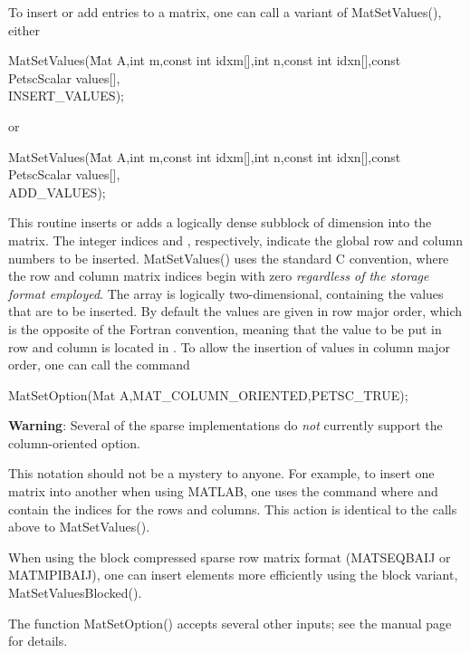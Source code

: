 To insert or add entries to a matrix, one can call a variant of MatSetValues(), either
\begin{tabbing}
  MatSetValues(\=Mat A,int m,const int idxm[],int n,const int idxn[],const PetscScalar values[],\\
            \>INSERT_VALUES);
\end{tabbing}
or 
\begin{tabbing}
  MatSetValues(\=Mat A,int m,const int idxm[],int n,const int idxn[],const PetscScalar values[],\\
            \>ADD_VALUES);
\end{tabbing}
This routine inserts or adds a logically dense subblock of dimension
 into the 
matrix. The integer indices  and , respectively, indicate the 
global row and column numbers to be inserted.  MatSetValues() uses the 
standard C convention, where the row and column matrix indices begin with 
zero {\em regardless of the storage format employed}.   The array 
 is logically two-dimensional, containing the values that are 
to be inserted. By default the values are given in row major order, which is the
opposite of the Fortran convention, meaning that the value to be put in row
 and column  is located in . To
allow the insertion of values in column major order, one can call the command
\begin{tabbing}
  MatSetOption(Mat A,MAT\_COLUMN\_ORIENTED,PETSC_TRUE);
\end{tabbing}
{\bf Warning}: Several of the sparse implementations do {\em not} currently
support the column-oriented option.

This notation should not be a mystery to anyone. For example, 
to insert one matrix into another when using MATLAB, one uses the command 
 where  and  contain the indices for the
rows and columns. This action is identical to the calls above to 
MatSetValues().

When using the block compressed sparse row matrix format (MATSEQBAIJ or
MATMPIBAIJ), one can insert elements more efficiently using the block
variant, MatSetValuesBlocked().

The function MatSetOption() accepts several other inputs; see
the manual page for details.

